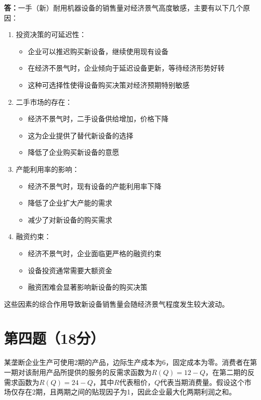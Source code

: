 \documentclass[12pt]{article}
\begin{document}
\noindent\textbf{答：}一手（新）耐用机器设备的销售量对经济景气高度敏感，主要有以下几个原因：

\begin{enumerate}
\item 投资决策的可延迟性：
    \begin{itemize}
    \item 企业可以推迟购买新设备，继续使用现有设备
    \item 在经济不景气时，企业倾向于延迟设备更新，等待经济形势好转
    \item 这种可选择性使得设备购买决策对经济预期特别敏感
    \end{itemize}

\item 二手市场的存在：
    \begin{itemize}
    \item 经济不景气时，二手设备供给增加，价格下降
    \item 这为企业提供了替代新设备的选择
    \item 降低了企业购买新设备的意愿
    \end{itemize}

\item 产能利用率的影响：
    \begin{itemize}
    \item 经济不景气时，现有设备的产能利用率下降
    \item 降低了企业扩大产能的需求
    \item 减少了对新设备的购买需求
    \end{itemize}

\item 融资约束：
    \begin{itemize}
    \item 经济不景气时，企业面临更严格的融资约束
    \item 设备投资通常需要大额资金
    \item 融资困难会显著影响新设备的购买决策
    \end{itemize}
\end{enumerate}

这些因素的综合作用导致新设备销售量会随经济景气程度发生较大波动。

\section*{第四题（18分）}
某垄断企业生产可使用2期的产品，边际生产成本为6，固定成本为零。消费者在第一期对该耐用产品所提供的服务的反需求函数为$R(Q)=12-Q$，在第二期的反需求函数为$R(Q)=24-Q$，其中$R$代表租价，$Q$代表当期消费量。假设这个市场仅存在2期，且两期之间的贴现因子为1，因此企业最大化两期利润之和。
\end{document}
